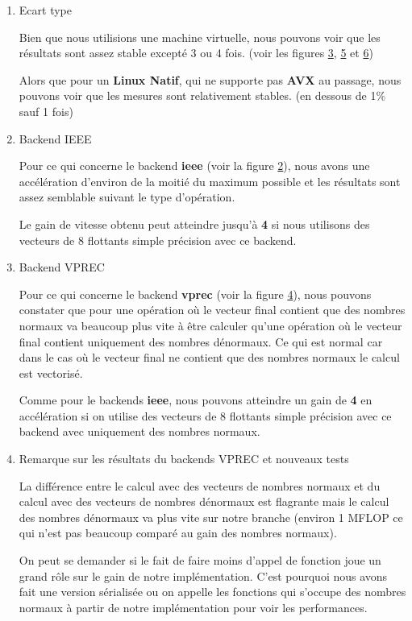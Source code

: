 \documentclass[11pt, letterpaper]{article}
\begin{document}
\begin{enumerate}
\item Ecart type
\label{sec:org1acce21}

Bien que nous utilisions une machine virtuelle, nous pouvons voir que les
résultats sont assez stable excepté 3 ou 4 fois. (voir les figures \hyperref[org3258189]{3}, \hyperref[orgefeadc4]{5} et \hyperref[org9344360]{6})

Alors que pour un \textbf{Linux Natif}, qui ne supporte pas \textbf{\textbf{AVX}} au passage,
nous pouvons voir que les mesures sont relativement stables. (en dessous de
1\% sauf 1 fois)

\item Backend IEEE
\label{sec:org4a19026}

Pour ce qui concerne le backend \textbf{ieee} (voir la figure \hyperref[orgc6fb931]{2}), nous avons une
accélération d'environ de la moitié du maximum possible et les résultats sont
assez semblable suivant le type d'opération.

Le gain de vitesse obtenu peut atteindre jusqu'à \textbf{4} si nous utilisons des
vecteurs de 8 flottants simple précision avec ce backend.

\item Backend VPREC
\label{sec:orgbeaf913}

Pour ce qui concerne le backend \textbf{vprec} (voir la figure \hyperref[org19750b2]{4}), nous pouvons
constater que pour une opération où le vecteur final contient que des
nombres normaux va beaucoup plus vite à être calculer qu'une opération où le
vecteur final contient uniquement des nombres dénormaux. Ce qui est normal
car dans le cas où le vecteur final ne contient que des nombres normaux le
calcul est vectorisé.

Comme pour le backends \textbf{ieee}, nous pouvons atteindre un gain de \textbf{4} en
accélération si on utilise des vecteurs de 8 flottants simple précision
avec ce backend avec uniquement des nombres normaux.

\item Remarque sur les résultats du backends VPREC et nouveaux tests
\label{sec:org2cb920f}

La différence entre le calcul avec des vecteurs de nombres normaux et du
calcul avec des vecteurs de nombres dénormaux est flagrante mais le calcul
des nombres dénormaux va plus vite sur notre branche (environ 1 MFLOP ce
qui n'est pas beaucoup comparé au gain des nombres normaux).

On peut se demander si le fait de faire moins d'appel de fonction joue
un grand rôle sur le gain de notre implémentation. C'est pourquoi nous
avons fait une version sérialisée ou on appelle les fonctions qui s'occupe
des nombres normaux à partir de notre implémentation pour voir les
performances.


\end{enumerate}
\end{document}
